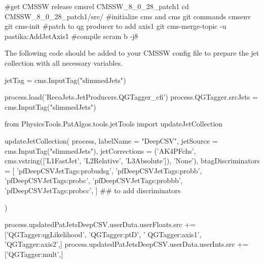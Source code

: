 \begin{DoxyCode}
\textcolor{preprocessor}{#get CMSSW release}
\textcolor{preprocessor}{}cmsrel CMSSW\_8\_0\_28\_patch1
cd CMSSW\_8\_0\_28\_patch1/src/
\textcolor{preprocessor}{#initialize cms and cms git commands }
\textcolor{preprocessor}{}cmsenv
git cms-init
\textcolor{preprocessor}{#patch to qg producer to add axis1}
\textcolor{preprocessor}{}git cms-merge-topic -u pastika:AddJetAxis1
\textcolor{preprocessor}{#compile}
\textcolor{preprocessor}{scram b -j8}
\end{DoxyCode}


The following code should be added to your C\-M\-S\-S\-W config file to prepare the jet collection with all necessary variables.


\begin{DoxyCode}
jetTag = cms.InputTag(\textcolor{stringliteral}{"slimmedJets"})

process.load(\textcolor{stringliteral}{'RecoJets.JetProducers.QGTagger\_cfi'})
process.QGTagger.srcJets   = cms.InputTag(\textcolor{stringliteral}{"slimmedJets"})

from PhysicsTools.PatAlgos.tools.jetTools \textcolor{keyword}{import} updateJetCollection

updateJetCollection(
   process,
   labelName = \textcolor{stringliteral}{"DeepCSV"},
   jetSource = cms.InputTag(\textcolor{stringliteral}{"slimmedJets"}),
   jetCorrections = (\textcolor{stringliteral}{'AK4PFchs'}, cms.vstring([\textcolor{stringliteral}{'L1FastJet'}, \textcolor{stringliteral}{'L2Relative'}, \textcolor{stringliteral}{'L3Absolute'}]), \textcolor{stringliteral}{'None'}),
   btagDiscriminators = [
      \textcolor{stringliteral}{'pfDeepCSVJetTags:probudsg'},
      \textcolor{stringliteral}{'pfDeepCSVJetTags:probb'},
      \textcolor{stringliteral}{'pfDeepCSVJetTags:probc'},
      \textcolor{stringliteral}{'pfDeepCSVJetTags:probbb'},
      \textcolor{stringliteral}{'pfDeepCSVJetTags:probcc'},
      ] ## to add discriminators                                                                           
                                                                                                                  
                             
)

process.updatedPatJetsDeepCSV.userData.userFloats.src += [\textcolor{stringliteral}{'QGTagger:qgLikelihood'}, \textcolor{stringliteral}{'QGTagger:ptD'}, \textcolor{stringliteral}{'
      QGTagger:axis1'}, \textcolor{stringliteral}{'QGTagger:axis2'},]
process.updatedPatJetsDeepCSV.userData.userInts.src += [\textcolor{stringliteral}{'QGTagger:mult'},]
\end{DoxyCode}


